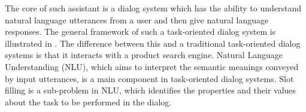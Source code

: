 The core of such assistant is a dialog system which 
has the ability to understand natural language utterances
from a user and then give natural language responses.
The general framework of such a task-oriented dialog system
is illustrated in .
The difference between this and a traditional task-oriented dialog systems
is that it interacts with a product search engine.
Natural Language Understanding (NLU), which aims to 
interpret the semantic meanings conveyed by input utterances, 
is a main component in task-oriented dialog systems. 
Slot filling is a sub-problem in NLU, which identifies
the properties and their values about the task to be performed in
the dialog.


